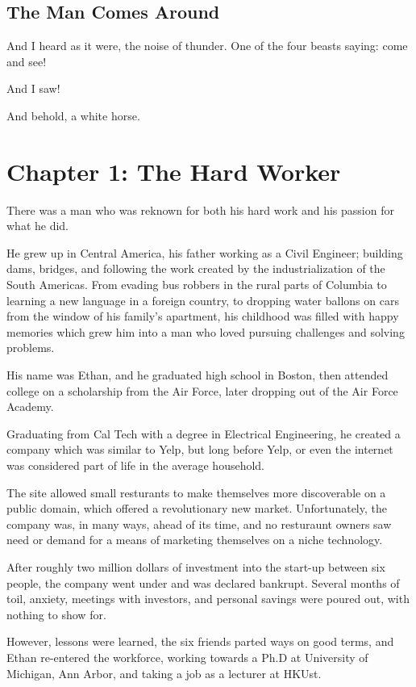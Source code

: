 \documentclass[a4paper,12pt,twoside]{book}
\begin{document}
\section{The Man Comes Around}
And I heard as it were, the noise of thunder.  One of the four beasts saying: come and see!
 
And I saw! 
 
And behold, a white horse.
 
\chapter{Chapter 1: The Hard Worker}
There was a man who was reknown for both his hard work and his passion for what he did.  

He grew up in Central America, his father working as a Civil Engineer; building dams, bridges, and following the work created by the industrialization of the South Americas.  From evading bus robbers in the rural parts of Columbia to learning a new language in a foreign country, to dropping water ballons on cars from the window of his family's apartment, his childhood was filled with happy memories which grew him into a man who loved pursuing challenges and solving problems.

His name was Ethan, and he graduated high school in Boston, then attended college on a scholarship from the Air Force, later dropping out of the Air Force Academy.

Graduating from Cal Tech with a degree in Electrical Engineering, he created a company which was similar to Yelp, but long before Yelp, or even the internet was considered part of life in the average household.  

The site allowed small resturants to make themselves more discoverable on a public domain, which offered a revolutionary new market.  Unfortunately, the company was, in many ways, ahead of its time, and no resturaunt owners saw need or demand for a means of marketing themselves on a niche technology. 

After roughly two million dollars of investment into the start-up between six people, the company went under and was declared bankrupt.  Several months of toil, anxiety, meetings with investors, and personal savings were poured out, with nothing to show for.

However, lessons were learned, the six friends parted ways on good terms, and Ethan re-entered the workforce, working towards a Ph.D at University of Michigan, Ann Arbor, and taking a job as a lecturer at HKUst.
\end{document}
